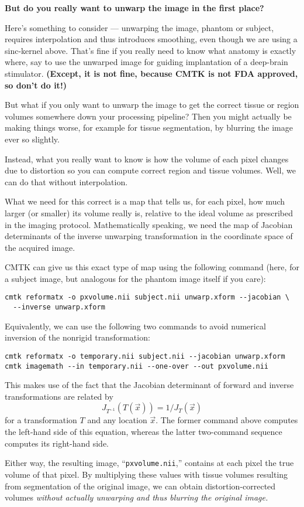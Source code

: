 \documentclass{InsightArticle}
\begin{document}
{\bf But do you really want to unwarp the image in the first place?}

Here's something to consider --- unwarping the image, phantom or subject,
requires interpolation and thus introduces smoothing, even though we are using
a sinc-kernel above. That's fine if you really need to know what anatomy is
exactly where, say to use the unwarped image for guiding implantation of a
deep-brain stimulator. {\bf (Except, it is not fine, because CMTK is not FDA
approved, so don't do it!)}

But what if you only want to unwarp the image to get the correct tissue or
region volumes somewhere down your processing pipeline? Then you might
actually be making things worse, for example for tissue segmentation, by
blurring the image ever so slightly.

Instead, what you really want to know is how the volume of each pixel changes
due to distortion so you can compute correct region and tissue volumes. Well,
we can do that without interpolation.

What we need for this correct is a map that tells us, for each pixel, how much
larger (or smaller) its volume really is, relative to the ideal volume as
prescribed in the imaging protocol. Mathematically speaking, we need the map
of Jacobian determinants of the inverse unwarping transformation in the
coordinate space of the acquired image. 

CMTK can give us this exact type of map using the following command (here, for
a subject image, but analogous for the phantom image itself if you care):
\begin{verbatim}
cmtk reformatx -o pxvolume.nii subject.nii unwarp.xform --jacobian \
  --inverse unwarp.xform
\end{verbatim}
Equivalently, we can use the following two commands to avoid numerical
inversion of the nonrigid transformation:
\begin{verbatim}
cmtk reformatx -o temporary.nii subject.nii --jacobian unwarp.xform
cmtk imagemath --in temporary.nii --one-over --out pxvolume.nii
\end{verbatim}
This makes use of the fact that the Jacobian determinant of forward and
inverse transformations are related by 
$$J_{T^{-1}}(T(\vec{x})) = 1/J_{T}(\vec{x})$$
for a transformation $T$ and any location $\vec{x}$. The former command above
computes the left-hand side of this equation, whereas the latter two-command
sequence computes its right-hand side.

Either way, the resulting image, ``\texttt{pxvolume.nii},'' contains at each
pixel the true volume of that pixel. By multiplying these values with tissue
volumes resulting from segmentation of the original image, we can obtain
distortion-corrected volumes {\em without actually unwarping and thus blurring
the original image.}
\end{document}
